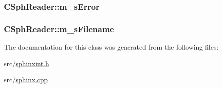 \hypertarget{classCSphReader_af08391a3629b2a3edb11f89adeb87763}{
\subsubsection[{m\-\_\-s\-Error}]{ C\-Sph\-Reader\-::m\-\_\-s\-Error\hspace{0.3cm}{\ttfamily [protected]}}}\label{classCSphReader_af08391a3629b2a3edb11f89adeb87763}
\hypertarget{classCSphReader_a7b8f5f7010d9d6e36af4378709c6935d}{
\subsubsection[{m\-\_\-s\-Filename}]{ C\-Sph\-Reader\-::m\-\_\-s\-Filename\hspace{0.3cm}{\ttfamily [protected]}}}\label{classCSphReader_a7b8f5f7010d9d6e36af4378709c6935d}


The documentation for this class was generated from the following files\-:\begin{DoxyCompactItemize}
\item 
src/\hyperlink{sphinxint_8h}{sphinxint.\-h}\item 
src/\hyperlink{sphinx_8cpp}{sphinx.\-cpp}\end{DoxyCompactItemize}

